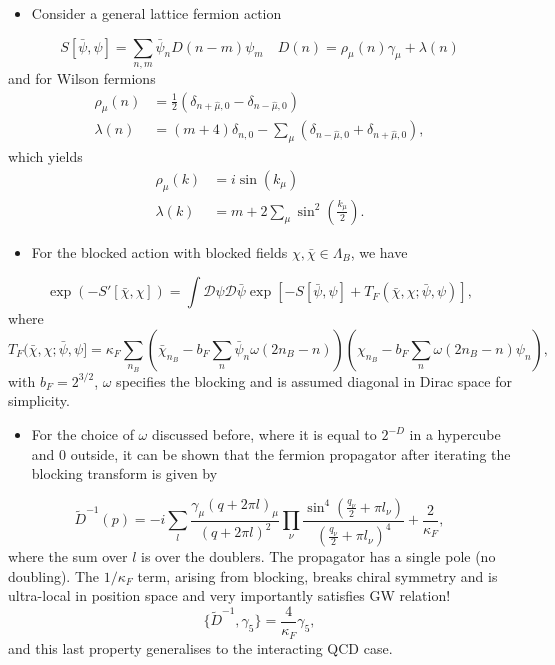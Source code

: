 \begin{itemize}
    \item Consider a general lattice fermion action
\end{itemize}
\begin{equation}
    S[\bar{\psi}, \psi] = \sum_{n,m} \bar{\psi}_n D(n-m) \psi_m \quad D(n) = \rho_\mu(n) \gamma_\mu + \lambda(n)
\end{equation}
and for Wilson fermions
\begin{align}
    \rho_\mu(n) &= \frac{1}{2}(\delta_{n+\hat{\mu}, 0} - \delta_{n - \hat{\mu}, 0}) \\
    \lambda(n) &= (m+4)\delta_{n,0} - \sum_\mu(\delta_{n - \hat{\mu}, 0} + \delta_{n + \hat{\mu}, 0}),
\end{align}
which yields
\begin{align}
    \rho_\mu(k) &= i \sin(k_\mu) \\
    \lambda(k) &= m + 2 \sum_\mu \sin^2\left(\frac{k_\mu}{2}\right).
\end{align}
\begin{itemize}
    \item For the blocked action with blocked fields $\chi, \bar{\chi} \in \Lambda_B$, we have
\end{itemize}
\begin{equation}
    \exp(-S'[\bar{\chi}, \chi]) = \int \mathcal{D}\psi \mathcal{D}\bar{\psi}\exp[-S[\bar{\psi}, \psi] + T_F(\bar{\chi}, \chi; \bar{\psi}, \psi)],
\end{equation}
where
\begin{equation}
    T_F(\bar{\chi}, \chi; \bar{\psi}, \psi] = \kappa_F \sum_{n_B}\left(\bar{\chi}_{n_B} - b_F \sum_n \bar{\psi}_n \omega(2n_B - n)\right)\left(\chi_{n_B} - b_F \sum_n \omega(2 n_B - n) \psi_n\right),
\end{equation}
with $b_F = 2^{3/2}$, $\omega$ specifies the blocking and is assumed diagonal in Dirac space for simplicity.
\begin{itemize}
    \item For the choice of $\omega$ discussed before, where it is equal to $2^{-D}$ in a hypercube and $0$ outside, it can be shown that the fermion propagator after iterating the blocking transform is given by
\end{itemize}
\begin{equation}
    \tilde{D}^{-1}(p) = -i \sum_l \frac{\gamma_\mu(q+2 \pi l)_\mu}{(q + 2 \pi l)^2}\prod_\nu \frac{\sin^4(\frac{q_\nu}{2}+ \pi l_\nu)}{(\frac{q_\nu}{2}+ \pi l_\nu)^4} + \frac{2}{\kappa_F},
\end{equation}
where the sum over $l$ is over the doublers. The propagator has a single pole (no doubling). The $1/\kappa_F$ term, arising from blocking, breaks chiral symmetry and is ultra-local in position space and very importantly satisfies GW relation!
\begin{equation}
    \{\tilde{D}^{-1}, \gamma_5\} = \frac{4}{\kappa_F}\gamma_5,
\end{equation}
and this last property generalises to the interacting QCD case.
